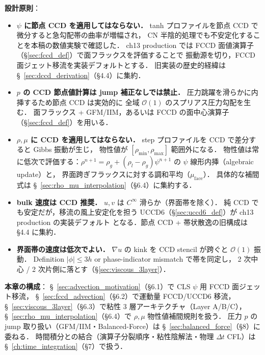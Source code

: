 \noindent\textbf{設計原則}：
\begin{itemize}
  \item \textbf{$\psi$ に節点 CCD を適用してはならない．}
        tanh プロファイルを節点 CCD で微分すると急勾配帯の曲率が増幅され，
        CN 半陰的処理でも不安定化することを本稿の数値実験で確認した．
        ch13 production では FCCD 面値演算子（\S\ref{sec:fccd_def}）で面フラックスを評価することで
        振動源を切り，FCCD 面ジェット移流を実装デフォルトとする．
        旧実装の歴史的経緯は \S~\ref{sec:dccd_derivation}（§4.4）に集約．
  \item \textbf{$p$ の CCD 節点値計算は jump 補正なしでは禁止．}
        圧力跳躍を滑らかに内挿するため節点 CCD は実効的に
        全域 $\mathcal{O}(1)$ のスプリアス圧力勾配を生む．
        面フラックス + GFM/IIM，あるいは FCCD の面中心演算子
        （\S\ref{sec:fccd_def}）を用いる．
  \item \textbf{$\rho, \mu$ に CCD を適用してはならない．}
        step プロファイルを CCD で差分すると Gibbs 振動が生じ，
        物性値が $[\rho_\text{min},\rho_\text{max}]$ 範囲外になる．
        物性値は常に低次で評価する：$\rho^{n+1} = \rho_g + (\rho_l-\rho_g)\psi^{n+1}$
        の $\psi$ 線形内挿（algebraic update）と，
        界面跨ぎフラックスに対する調和平均（$\mu_\text{face}$）．
        具体的な補間式は \S~\ref{sec:rho_mu_interpolation}（§6.4）に集約する．
  \item \textbf{bulk 速度は CCD 推奨．}
        $u, v$ は $C^\infty$ 滑らか（界面帯を除く）．
        純 CCD でも安定だが，移流の風上安定化を担う
        UCCD6（\S\ref{sec:uccd6_def}）が ch13 production の実装デフォルト
        となる．節点 CCD + 帯状散逸の旧構成は §4.4 に集約．
  \item \textbf{界面帯の速度は低次でよい．}
        $\nabla u$ の kink を CCD stencil が跨ぐと $\mathcal{O}(1)$ 振動．
        Definition $|\phi|\le 3h$ or phase-indicator mismatch で帯を同定し，
        2 次中心 / 2 次片側に落とす（\S\ref{sec:viscous_3layer}）．
\end{itemize}


\noindent\textbf{本章の構成}：
\S~\ref{sec:advection_motivation}（§6.1）で CLS $\psi$ 用 FCCD 面ジェット移流，
\S~\ref{sec:fccd_advection}（§6.2）で運動量 FCCD/UCCD6 移流，
\S~\ref{sec:viscous_3layer}（§6.3）で粘性 3 層アーキテクチャ（Layer A/B/C），
\S~\ref{sec:rho_mu_interpolation}（§6.4）で $\rho,\mu$ 物性値補間規則を扱う．
圧力 $p$ の jump 取り扱い（GFM/IIM・Balanced-Force）は
\S~\ref{sec:balanced_force}（§8）に委ねる．
時間積分との結合（演算子分裂順序・粘性陰解法・物理 $\Delta t$ CFL）は
\S~\ref{ch:time_integration}（§7）で扱う．

